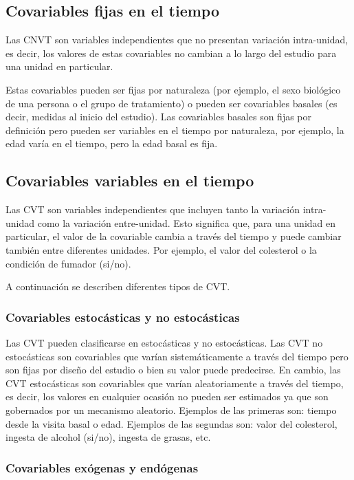 \documentclass[spanish]{article}
\numberwithin{figure}{subsection}
\numberwithin{equation}{subsection}
\numberwithin{table}{subsection}
\begin{document}
\subsection{Covariables fijas en el tiempo}

Las CNVT son variables independientes que no presentan variación intra-unidad,
es decir, los valores de estas covariables no cambian a lo largo del estudio
para una unidad en particular.

Estas covariables pueden ser fijas por naturaleza (por ejemplo, el sexo
biológico de una persona o el grupo de tratamiento) o pueden ser covariables
basales (es decir, medidas al inicio del estudio). Las covariables basales son
fijas por definición pero pueden ser variables en el tiempo por naturaleza, por
ejemplo, la edad varía en el tiempo, pero la edad basal es fija.

\subsection{Covariables variables en el tiempo}

Las CVT son variables independientes que incluyen tanto la variación
intra-unidad como la variación entre-unidad. Esto significa que, para una unidad
en particular, el valor de la covariable cambia a través del tiempo y puede
cambiar también entre diferentes unidades. Por ejemplo, el valor del colesterol
o la condición de fumador (si/no).

A continuación se describen diferentes tipos de CVT.

\subsubsection{Covariables estocásticas y no estocásticas}

Las CVT pueden clasificarse en estocásticas y no estocásticas. Las CVT no
estocásticas son covariables que varían sistemáticamente a través del tiempo
pero son fijas por diseño del estudio o bien su valor puede predecirse. En
cambio, las CVT estocásticas son covariables que varían aleatoriamente a través
del tiempo, es decir, los valores en cualquier ocasión no pueden ser estimados
ya que son gobernados por un mecanismo aleatorio. Ejemplos de las primeras son:
tiempo desde la visita basal o edad. Ejemplos de las segundas son: valor del
colesterol, ingesta de alcohol (si/no), ingesta de grasas, etc.

\subsubsection{Covariables exógenas y endógenas}
\label{seccion_de_exogeneidad}
\end{document}
